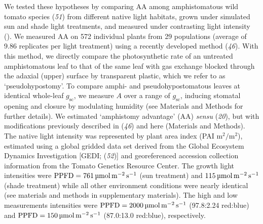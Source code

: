\documentclass[
  letterpaper,
  DIV=11,
  numbers=noendperiod]{scrartcl}
\newcommand{\aax}{$\mathrm{AA}$}
\newcommand{\ppfdequals}[1]{$\mathrm{PPFD} = \qty{#1}{\micro\mol\raiseto{-2}\meter\raiseto{-1}\second}$}
\newcommand{\ppfdqty}[1]{$\qty{#1}{\micro\mol\raiseto{-2}\meter\raiseto{-1}\second}$}
\begin{document}
We tested these hypotheses by comparing \aax{} among amphistomatous wild
tomato species (\emph{51}) from different native light habitats, grown
under simulated sun and shade light treatments, and measured under
contrasting light intensity (). We measured AA on 572 individual plants
from 29 populations (average of 9.86 replicates per light treatment)
using a recently developed method (\emph{46}). With this method, we
directly compare the photosynthetic rate of an untreated amphistomatous
leaf to that of the same leaf with gas exchange blocked through the
adaxial (upper) surface by transparent plastic, which we refer to as
`pseudohypostomy'. To compare amphi- and pseudohypostomatous leaves at
identical whole-leaf \(g_\text{sc}\), we measure \(A\) over a range of
\(g_\text{sc}\), inducing stomatal opening and closure by modulating
humidity (see Materials and Methods for further details). We estimated
`amphistomy advantage' (\aax) \emph{sensu} (\emph{20}), but with
modifications previously described in (\emph{46}) and here (Materials
and Methods). The native light intensity was represented by plant area
index (PAI \(\unit{\meter\squared\per\meter\squared}\)), estimated using
a global gridded data set derived from the Global Ecosystem Dynamics
Investigation {[}GEDI; (\emph{52}){]} and georeferenced accession
collection information from the Tomato Genetics Resource Center. The
growth light intensities were \ppfdequals{761} (sun treatment) and
\ppfdqty{115} (shade treatment) while all other environment conditions
were nearly identical (see materials and methods in supplementary
materials). The high and low measurements intensities were
\ppfdequals{2000} (97.8:2.24 red:blue) and \ppfdequals{150} (87.0:13.0
red:blue), respectively.
\end{document}
